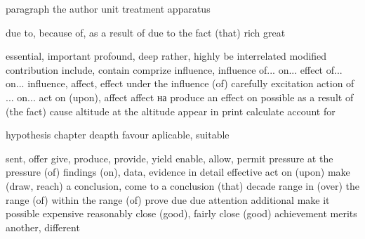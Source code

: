 \begin{multicols}{2}

	{paragraph}
	{the author}
	{unit} 
	{treatment}
	{apparatus}

	{due to, because of, as a result of}
	{due to the fact (that)}
	{rich}
	{great}

	{essential, important}
	{profound, deep}
	{rather, highly}
	{be interrelated}
	{modified}
	{contribution}
	{include, contain}
	{comprize}
	{influence, influence of... on... effect of... on...}
	{influence, affect, effect}
	{under the influence (of)}
	{carefully}
	{excitation}
	{action of ... on...}
	{act on (upon), affect}
	{affect}
	{на produce an effect on}
	{possible}
	{as a result of (the fact)}
	{cause}
	{altitude}
	{at the altitude}
	{appear in print}
	{calculate}
	{account for}

	{hypothesis}
	{chapter}
	{deapth}
	{favour}
	{aplicable, suitable}

	{sent, offer}
	{give, produce, provide, yield}
	{enable, allow, permit}
	{pressure}
	{at the pressure (of)}
	{findings (on), data, evidence}
	{in detail}
	{effective}
	{act on (upon)}
	{make (draw, reach) a conclusion, come to a conclusion (that)}
	{decade}
	{range}
	{in (over) the range (of)}
	{within the range (of)}
	{prove}
	{due}
	{due attention}
	{additional}
	{make it possible}
	{expensive}
	{reasonably close (good), fairly close (good)}
	{achievement}
	{merits} 
	{another, different}


\end{multicols}
